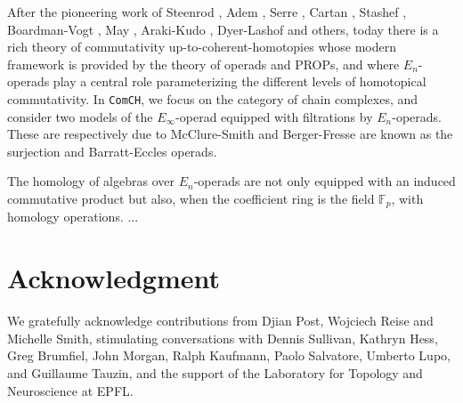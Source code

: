 \documentclass{amsart}
\begin{document}
After the pioneering work of Steenrod \cite{Steenrod47, Steenrod62}, Adem \cite{Adem52}, Serre \cite{Serre53}, Cartan \cite{Cartan55}, Stashef \cite{Stasheff63}, Boardman-Vogt \cite{BoardmanVogt73}, May \cite{May70algebraic, May72geometry}, Araki-Kudo \cite{ArakiKudo56}, Dyer-Lashof \cite{DyerLashof62} and others, today there is a rich theory of commutativity up-to-coherent-homotopies whose modern framework is provided by the theory of operads and PROPs, and where $E_n$-operads play a central role parameterizing the different levels of homotopical commutativity. In \texttt{ComCH}, we focus on the category of chain complexes, and consider two models of the $E_\infty$-operad equipped with filtrations by $E_n$-operads. These are respectively due to McClure-Smith \cite{McClureSmith03} and Berger-Fresse \cite{BergerFresse04} are known as the surjection and Barratt-Eccles operads.

The homology of algebras over $E_n$-operads are not only equipped with an induced commutative product but also, when the coefficient ring is the field $\mathbb F_p$, with homology operations. ... 


\section*{Acknowledgment}
We gratefully acknowledge contributions from Djian Post, Wojciech Reise and Michelle Smith, stimulating conversations with Dennis Sullivan, Kathryn Hess, Greg Brumfiel, John Morgan, Ralph Kaufmann, Paolo Salvatore, Umberto Lupo, and Guillaume Tauzin, and the support of the Laboratory for Topology and Neuroscience at EPFL.



\end{document}
